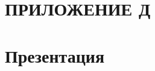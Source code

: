 \section*{ПРИЛОЖЕНИЕ Д}
\section*{Презентация}
\setcounter{listing}{0}
\renewcommand{\thelisting}{Г.\arabic{listing}}%
